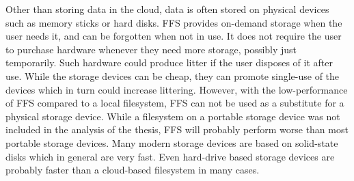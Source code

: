 Other than storing data in the cloud, data is often stored on physical devices such as memory sticks or hard disks. \gls{FFS} provides \mbox{on-demand} storage when the user needs it, and can be forgotten when not in use. It does not require the user to purchase hardware whenever they need more storage, possibly just temporarily. Such hardware could produce litter if the user disposes of it after use. While the storage devices can be cheap, they can promote \mbox{single-use} of the devices which in turn could increase littering. However, with the low-performance of \gls{FFS} compared to a local filesystem, \gls{FFS} can not be used as a substitute for a physical storage device. While a filesystem on a portable storage device was not included in the analysis of the thesis, \gls{FFS} will probably perform worse than most portable storage devices. Many modern storage devices are based on solid-state disks which in general are very fast. Even hard-drive based storage devices are probably faster than a \mbox{cloud-based} filesystem in many cases.

